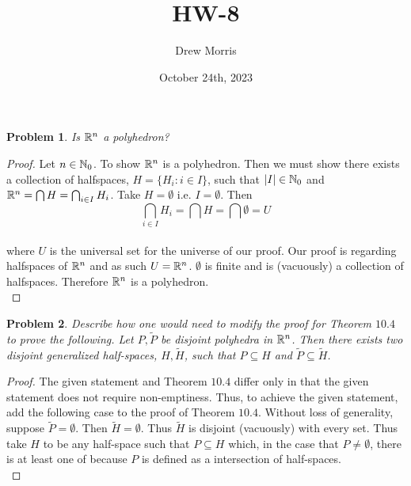 \documentclass[12pt,oneside]{amsart}
\title{HW-8}
\author{Drew Morris}
\date{October 24th, 2023}
\numberwithin{equation}{section}
\numberwithin{figure}{section}
\theoremstyle{plain}
\newtheorem{prob}{Problem}
\theoremstyle{definition}
\newcommand{\R}{\ensuremath \mathbb{R}}
\newcommand{\N}{\ensuremath \mathbb{N}}
\begin{document}
\maketitle

\begin{prob}
Is $\R^n$ a polyhedron? \\
\end{prob}
\begin{proof}
Let $n \in \N_0$. To show $\R^n$ is a polyhedron. Then we must show there exists 
a collection of halfspaces, $H = \{H_i : i \in I\}$, such that $|I| \in \N_0$ and 
$\R^n = \bigcap H = \bigcap_{i \in I}H_i$. Take $H = \emptyset$ i.e. $I = \emptyset$. 
Then \\
\[\bigcap_{i \in I}H_i = \bigcap H = \bigcap \emptyset = U\] \\ 
where $U$ is the universal set for the universe of our proof. Our proof is 
regarding halfspaces of $\R^n$ and as such $U = \R^n$. $\emptyset$ is finite and 
is (vacuously) a collection of halfspaces. Therefore $\R^n$ is a polyhedron. \\
\end{proof}

\begin{prob}
Describe how one would need to modify the proof for Theorem $10.4$ to prove the 
following. Let $P,\tilde{P}$ be disjoint polyhedra in $\R^n$. Then there exists 
two disjoint generalized half-spaces, $H,\tilde{H}$, such that $P \subseteq H$ 
and $\tilde{P} \subseteq \tilde{H}$. \\
\end{prob}
\begin{proof}
The given statement and Theorem $10.4$ differ only in that the given statement 
does not require non-emptiness. Thus, to achieve the given statement, add the 
following case to the proof of Theorem $10.4$. Without loss of generality, suppose 
$\tilde{P} = \emptyset$. Then $\tilde{H} = \emptyset$. Thus $\tilde{H}$ is 
disjoint (vacuously) with every set. Thus take $H$ to be any half-space such that 
$P \subseteq H$ which, in the case that $P \neq \emptyset$, there is at least one 
of because $P$ is defined as a intersection of half-spaces. \\
\end{proof}
\end{document}
